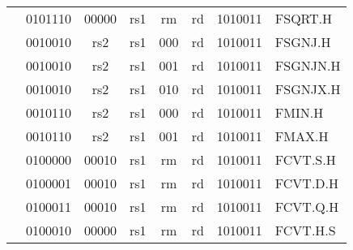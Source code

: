 \begin{table}[p]
\begin{small}
\begin{center}
\begin{tabular}{p{0in}p{0.4in}p{0.05in}p{0.05in}p{0.05in}p{0.05in}p{0.4in}p{0.6in}p{0.4in}p{0.6in}p{0.7in}l}
&
\multicolumn{4}{|c|}{0101110} &
\multicolumn{2}{c|}{00000} &
\multicolumn{1}{c|}{rs1} &
\multicolumn{1}{c|}{rm} &
\multicolumn{1}{c|}{rd} &
\multicolumn{1}{c|}{1010011} & FSQRT.H \\
\cline{2-11}


&
\multicolumn{4}{|c|}{0010010} &
\multicolumn{2}{c|}{rs2} &
\multicolumn{1}{c|}{rs1} &
\multicolumn{1}{c|}{000} &
\multicolumn{1}{c|}{rd} &
\multicolumn{1}{c|}{1010011} & FSGNJ.H \\
\cline{2-11}


&
\multicolumn{4}{|c|}{0010010} &
\multicolumn{2}{c|}{rs2} &
\multicolumn{1}{c|}{rs1} &
\multicolumn{1}{c|}{001} &
\multicolumn{1}{c|}{rd} &
\multicolumn{1}{c|}{1010011} & FSGNJN.H \\
\cline{2-11}


&
\multicolumn{4}{|c|}{0010010} &
\multicolumn{2}{c|}{rs2} &
\multicolumn{1}{c|}{rs1} &
\multicolumn{1}{c|}{010} &
\multicolumn{1}{c|}{rd} &
\multicolumn{1}{c|}{1010011} & FSGNJX.H \\
\cline{2-11}


&
\multicolumn{4}{|c|}{0010110} &
\multicolumn{2}{c|}{rs2} &
\multicolumn{1}{c|}{rs1} &
\multicolumn{1}{c|}{000} &
\multicolumn{1}{c|}{rd} &
\multicolumn{1}{c|}{1010011} & FMIN.H \\
\cline{2-11}


&
\multicolumn{4}{|c|}{0010110} &
\multicolumn{2}{c|}{rs2} &
\multicolumn{1}{c|}{rs1} &
\multicolumn{1}{c|}{001} &
\multicolumn{1}{c|}{rd} &
\multicolumn{1}{c|}{1010011} & FMAX.H \\
\cline{2-11}


&
\multicolumn{4}{|c|}{0100000} &
\multicolumn{2}{c|}{00010} &
\multicolumn{1}{c|}{rs1} &
\multicolumn{1}{c|}{rm} &
\multicolumn{1}{c|}{rd} &
\multicolumn{1}{c|}{1010011} & FCVT.S.H \\
\cline{2-11}


&
\multicolumn{4}{|c|}{0100001} &
\multicolumn{2}{c|}{00010} &
\multicolumn{1}{c|}{rs1} &
\multicolumn{1}{c|}{rm} &
\multicolumn{1}{c|}{rd} &
\multicolumn{1}{c|}{1010011} & FCVT.D.H \\
\cline{2-11}


&
\multicolumn{4}{|c|}{0100011} &
\multicolumn{2}{c|}{00010} &
\multicolumn{1}{c|}{rs1} &
\multicolumn{1}{c|}{rm} &
\multicolumn{1}{c|}{rd} &
\multicolumn{1}{c|}{1010011} & FCVT.Q.H \\
\cline{2-11}


&
\multicolumn{4}{|c|}{0100010} &
\multicolumn{2}{c|}{00000} &
\multicolumn{1}{c|}{rs1} &
\multicolumn{1}{c|}{rm} &
\multicolumn{1}{c|}{rd} &
\multicolumn{1}{c|}{1010011} & FCVT.H.S \\
\cline{2-11}



\end{tabular}
\end{center}
\end{small}
\end{table}
